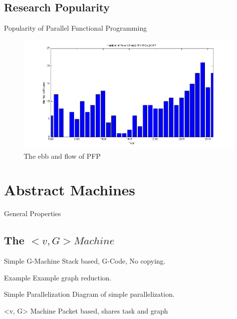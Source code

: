 \documentclass{beamer}
\begin{document}
\subsection[Research Popularity]{Research Popularity}

\begin{frame}[fragile]{Popularity of Parallel Functional Programming}{}
    \begin{figure}
    \centering
        \includegraphics[scale=.4]{figures/numPapers.png}
        \caption{The ebb and flow of PFP}
    \end{figure}
\end{frame}

\section{Abstract Machines}

\begin{frame}{General Properties}
\end{frame}

\subsection[The $< v, G> Machine$]{The $< v, G> Machine$}

\begin{frame}{Simple G-Machine}
Stack based, G-Code, No copying.
\end{frame}

\begin{frame}{Example}
Example graph reduction.
\end{frame}

\begin{frame}{Simple Parallelization}
Diagram of simple parallelization.
\end{frame}
\begin{frame}{<v, G> Machine}
Packet based, shares task and graph
\end{frame}
\end{document}
